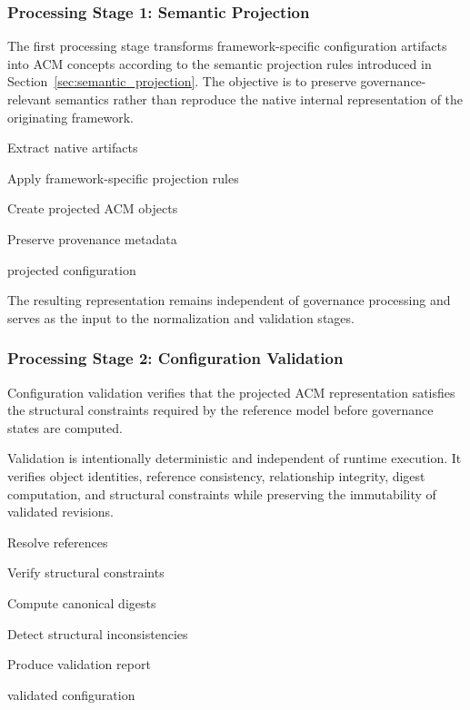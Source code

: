 \documentclass[10pt]{article}
\begin{document}
\subsubsection{Processing Stage 1: Semantic Projection}

The first processing stage transforms framework-specific configuration artifacts into ACM concepts according to the semantic projection rules introduced in Section~\ref{sec:semantic_projection}. The objective is to preserve governance-relevant semantics rather than reproduce the native internal representation of the originating framework.

\begin{algorithm}[ht]
\caption{Semantic Projection}

Extract native artifacts\;

Apply framework-specific projection rules\;

Create projected ACM objects\;

Preserve provenance metadata\;

\Return projected configuration\;

\end{algorithm}

The resulting representation remains independent of governance processing and serves as the input to the normalization and validation stages.

\subsubsection{Processing Stage 2: Configuration Validation}

Configuration validation verifies that the projected ACM representation satisfies the structural constraints required by the reference model before governance states are computed.

Validation is intentionally deterministic and independent of runtime execution. It verifies object identities, reference consistency, relationship integrity, digest computation, and structural constraints while preserving the immutability of validated revisions.

\begin{algorithm}[ht]
\caption{Configuration Validation}

Resolve references\;

Verify structural constraints\;

Compute canonical digests\;

Detect structural inconsistencies\;

Produce validation report\;

\Return validated configuration\;

\end{algorithm}
\end{document}

